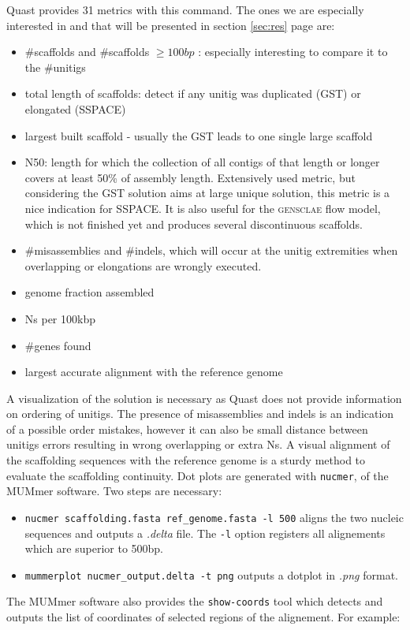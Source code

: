 \documentclass[12pt]{article}
\newcommand*{\fulleref}[1]{section \hyperref[{#1}] {\ref*{#1}} page {\pageref{#1}}}%
\begin{document}
Quast provides 31 metrics with this command. The ones we are especially interested in and that will be presented in \fulleref{sec:res} are: 
\begin{itemize}
\item \#scaffolds and \#scaffolds $\geq 100bp$ : especially interesting to compare it to the \#unitigs
\item total length of scaffolds: detect if any unitig was duplicated (GST) or elongated (SSPACE)
\item largest built scaffold - usually the GST leads to one single large scaffold
\item N50:  length for which the collection of all contigs of that length or longer covers at least 50\% of assembly length. Extensively used metric, but considering the GST solution aims at large unique solution, this metric is a nice indication for SSPACE. It is also useful for the \textsc{gensclae} flow model, which is not finished yet and produces several discontinuous scaffolds.
\item \#misassemblies and \#indels, which will occur at the unitig extremities when overlapping or elongations are wrongly executed.
\item genome fraction assembled 
\item Ns per 100kbp
\item \#genes found
\item largest accurate alignment with the reference genome
\end{itemize}
A visualization of the solution is necessary as Quast does not provide information on ordering of unitigs. The presence of misassemblies and indels is an indication of a possible order mistakes, however it can also be small distance between unitigs errors resulting in wrong overlapping or extra Ns. A visual alignment of the scaffolding sequences with the reference genome is a sturdy method to evaluate the scaffolding continuity. Dot plots are generated with \texttt{nucmer}, of the MUMmer software. Two steps are necessary: 
\begin{itemize}
\item \texttt{nucmer scaffolding.fasta ref\_genome.fasta -l 500} aligns the two nucleic sequences and outputs a \textit{.delta} file. The \texttt{-l} option registers all alignements which are superior to 500bp.
\item \texttt{mummerplot nucmer\_output.delta -t png} outputs a dotplot in \textit{.png} format.
\end{itemize}
The MUMmer software also provides the \texttt{show-coords} tool which detects and outputs the list of coordinates of selected regions of the alignement. For example:
\end{document}
